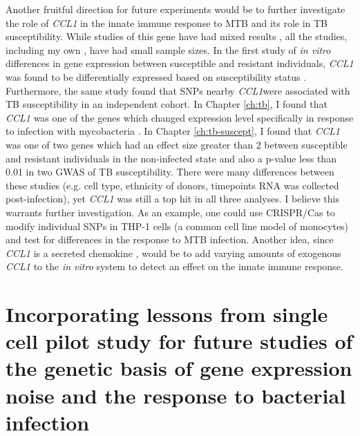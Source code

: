 Another fruitful direction for future experiments would be to further
investigate the role of \emph{CCL1} in the innate immune response to
MTB and its role in TB susceptibility. While studies of this gene have
had mixed results \citep{Thuong2008, Tang2011, Ozdemir2013}, all the
studies, including my own \citep{Blischak2015}, have had small sample
sizes. In the first study of \emph{in vitro} differences in gene
expression between susceptible and resistant individuals, \emph{CCL1}
was found to be differentially expressed based on susceptibility
status \citep{Thuong2008}. Furthermore, the same study found that SNPs
nearby \emph{CCL1}were associated with TB susceptibility in an
independent cohort. In Chapter \ref{ch:tb}, I found that \emph{CCL1}
was one of the genes which changed expression level specifically in
response to infection with mycobacteria \citep{Blischak2015}. In
Chapter \ref{ch:tb-suscept}, I found that \emph{CCL1} was one of two
genes which had an effect size greater than 2 between susceptible and
resistant individuals in the non-infected state and also a p-value
less than 0.01 in two GWAS of TB susceptibility. There were many
differences between these studies (e.g. cell type, ethnicity of
donors, timepoints RNA was collected post-infection), yet \emph{CCL1}
was still a top hit in all three analyses. I believe this warrants
further investigation. As an example, one could use CRISPR/Cas
\citep{Du2016} to modify individual SNPs in THP-1 cells (a common cell
line model of monocytes) and test for differences in the response to
MTB infection. Another idea, since \emph{CCL1} is a secreted chemokine
\citep{Miller1992}, would be to add varying amounts of exogenous
\emph{CCL1} to the \emph{in vitro} system to detect an effect on the
innate immune response.

\section{Incorporating lessons from single cell pilot study for future studies of the genetic basis of gene expression noise and the response to bacterial infection}

